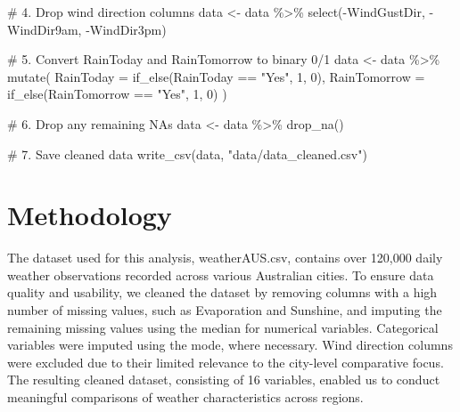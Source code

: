 \documentclass[
  letterpaper,
  DIV=11,
  numbers=noendperiod]{scrartcl}
\newenvironment{Shaded}{\begin{snugshade}}{\end{snugshade}}
\newcommand{\AttributeTok}[1]{\textcolor[rgb]{0.40,0.45,0.13}{#1}}
\newcommand{\CommentTok}[1]{\textcolor[rgb]{0.37,0.37,0.37}{#1}}
\newcommand{\DecValTok}[1]{\textcolor[rgb]{0.68,0.00,0.00}{#1}}
\newcommand{\FunctionTok}[1]{\textcolor[rgb]{0.28,0.35,0.67}{#1}}
\newcommand{\NormalTok}[1]{\textcolor[rgb]{0.00,0.23,0.31}{#1}}
\newcommand{\OtherTok}[1]{\textcolor[rgb]{0.00,0.23,0.31}{#1}}
\newcommand{\SpecialCharTok}[1]{\textcolor[rgb]{0.37,0.37,0.37}{#1}}
\newcommand{\StringTok}[1]{\textcolor[rgb]{0.13,0.47,0.30}{#1}}
\begin{document}
\begin{Shaded}
\begin{Highlighting}[]
\CommentTok{\# 4. Drop wind direction columns}
\NormalTok{data }\OtherTok{\textless{}{-}}\NormalTok{ data }\SpecialCharTok{\%\textgreater{}\%}
  \FunctionTok{select}\NormalTok{(}\SpecialCharTok{{-}}\NormalTok{WindGustDir, }\SpecialCharTok{{-}}\NormalTok{WindDir9am, }\SpecialCharTok{{-}}\NormalTok{WindDir3pm)}

\CommentTok{\# 5. Convert RainToday and RainTomorrow to binary 0/1}
\NormalTok{data }\OtherTok{\textless{}{-}}\NormalTok{ data }\SpecialCharTok{\%\textgreater{}\%}
  \FunctionTok{mutate}\NormalTok{(}
    \AttributeTok{RainToday =} \FunctionTok{if\_else}\NormalTok{(RainToday }\SpecialCharTok{==} \StringTok{"Yes"}\NormalTok{, }\DecValTok{1}\NormalTok{, }\DecValTok{0}\NormalTok{),}
    \AttributeTok{RainTomorrow =} \FunctionTok{if\_else}\NormalTok{(RainTomorrow }\SpecialCharTok{==} \StringTok{"Yes"}\NormalTok{, }\DecValTok{1}\NormalTok{, }\DecValTok{0}\NormalTok{)}
\NormalTok{  )}

\CommentTok{\# 6. Drop any remaining NAs}
\NormalTok{data }\OtherTok{\textless{}{-}}\NormalTok{ data }\SpecialCharTok{\%\textgreater{}\%} \FunctionTok{drop\_na}\NormalTok{()}
\end{Highlighting}
\end{Shaded}

\begin{Shaded}
\begin{Highlighting}[]
\CommentTok{\# 7. Save cleaned data}
\FunctionTok{write\_csv}\NormalTok{(data, }\StringTok{"data/data\_cleaned.csv"}\NormalTok{)}
\end{Highlighting}
\end{Shaded}

\section{Methodology}\label{methodology}

The dataset used for this analysis, weatherAUS.csv, contains over
120,000 daily weather observations recorded across various Australian
cities. To ensure data quality and usability, we cleaned the dataset by
removing columns with a high number of missing values, such as
Evaporation and Sunshine, and imputing the remaining missing values
using the median for numerical variables. Categorical variables were
imputed using the mode, where necessary. Wind direction columns were
excluded due to their limited relevance to the city-level comparative
focus. The resulting cleaned dataset, consisting of 16 variables,
enabled us to conduct meaningful comparisons of weather characteristics
across regions.
\end{document}
